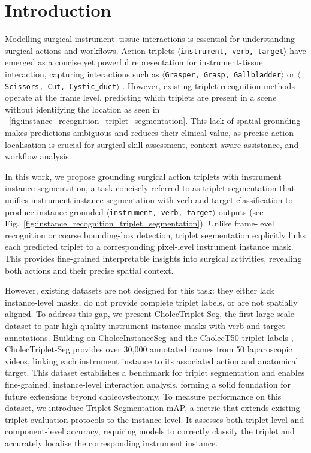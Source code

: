 \documentclass[pdflatex,sn-mathphys-num]{sn-jnl}%
\newcommand{\ivttriplet}{\texttt{$\langle$instrument, verb, target$\rangle$}\xspace}
\newcommand{\triplet}[3]{\texttt{$\langle$#1, #2, #3$\rangle$}\xspace}
\newcommand{\figref}[1]{\figurename~\ref{#1}}
\theoremstyle{thmstyleone}%
\theoremstyle{thmstyletwo}%
\theoremstyle{thmstylethree}%
\begin{document}
\section{Introduction}\label{sec::introduction}

Modelling surgical instrument–tissue interactions is essential for understanding surgical actions and workflows. Action triplets \ivttriplet have emerged as a concise yet powerful representation for instrument-tissue interaction, capturing interactions such as \triplet{Grasper}{Grasp}{Gallbladder} or \triplet{Scissors}{Cut}{Cystic\_duct} \cite{nwoye2020recognition}. However, existing triplet recognition methods \cite{nwoye2020recognition,nwoye2022rendezvous,yamlahi2023self} operate at the frame level, predicting which triplets are present in a scene without identifying the location as seen in \figref{fig:instance_recognition_triplet_segmentation}. This lack of spatial grounding makes predictions ambiguous and reduces their clinical value, as precise action localisation is crucial for surgical skill assessment, context-aware assistance, and workflow analysis.

In this work, we propose grounding surgical action triplets with instrument instance segmentation, a task concisely referred to as triplet segmentation that unifies instrument instance segmentation with verb and target classification to produce instance-grounded \ivttriplet outputs (see Fig.~\ref{fig:instance_recognition_triplet_segmentation}). 
Unlike frame-level recognition or coarse bounding-box detection,  triplet segmentation explicitly links each predicted triplet to a corresponding pixel-level instrument instance mask. This provides fine-grained interpretable insights into surgical activities, revealing both actions and their precise spatial context.

However, existing datasets are not designed for this task: they either lack instance-level masks, do not provide complete triplet labels, or are not spatially aligned. 
To address this gap, we present CholecTriplet-Seg, the first large-scale dataset to pair high-quality instrument instance masks with verb and target annotations. 
Building on CholecInstanceSeg \cite{alabi2025cholecinstanceseg} and the CholecT50 triplet labels \cite{nwoye2022rendezvous}, CholecTriplet-Seg provides over 30,000 annotated frames from 50 laparoscopic videos, linking each instrument instance to its associated action and anatomical target. This dataset establishes a benchmark for triplet segmentation and enables fine-grained, instance-level interaction analysis, forming a solid foundation for future extensions beyond cholecystectomy. To measure performance on this dataset, we introduce Triplet Segmentation mAP, a metric that extends existing triplet evaluation protocols to the instance level. It assesses both triplet-level and component-level accuracy, requiring models to correctly classify the triplet and accurately localise the corresponding instrument instance.
\end{document}
